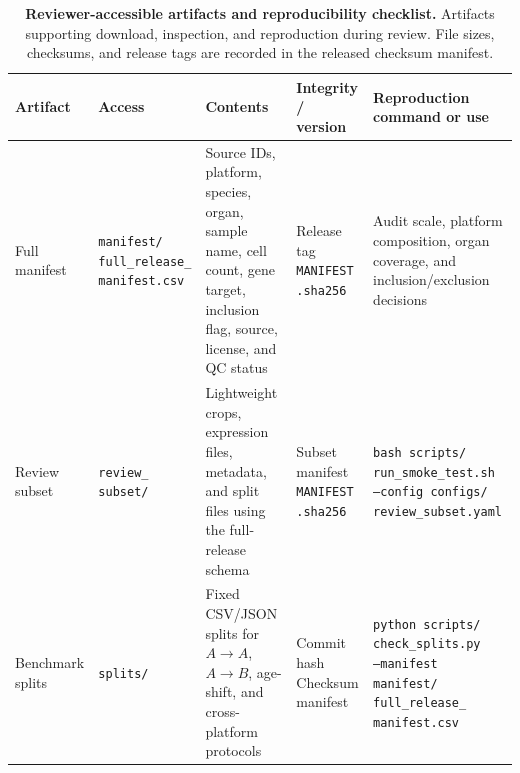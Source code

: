 \documentclass{article}
\begin{document}
\begin{table}[!t]
\centering
\scriptsize
\setlength{\tabcolsep}{2.4pt}
\renewcommand{\arraystretch}{0.98}
\setlength{\abovecaptionskip}{4pt}
\setlength{\belowcaptionskip}{3pt}

\caption{\textbf{Reviewer-accessible artifacts and reproducibility checklist.}
Artifacts supporting download, inspection, and reproduction during review. File sizes, checksums, and release tags are recorded in the released checksum manifest.}
\label{tab:S5_review_artifact_checklist}

\begin{tabularx}{\textwidth}{
>{\raggedright\arraybackslash}p{1.75cm}
>{\raggedright\arraybackslash}p{2.15cm}
>{\raggedright\arraybackslash}X
>{\raggedright\arraybackslash}p{1.90cm}
>{\raggedright\arraybackslash}X
}
\toprule
\textbf{Artifact} &
\textbf{Access} &
\textbf{Contents} &
\textbf{Integrity / version} &
\textbf{Reproduction command or use} \\
\midrule

Full manifest &
\makecell[l]{\texttt{manifest/}\\
\texttt{full\_release\_}\\
\texttt{manifest.csv}} &
Source IDs, platform, species, organ, sample name, cell count, gene target, inclusion flag, source, license, and QC status &
\makecell[l]{Release tag\\
\texttt{MANIFEST}\\
\texttt{.sha256}} &
Audit scale, platform composition, organ coverage, and inclusion/exclusion decisions \\

Review subset &
\makecell[l]{\texttt{review\_}\\
\texttt{subset/}} &
Lightweight crops, expression files, metadata, and split files using the full-release schema &
\makecell[l]{Subset manifest\\
\texttt{MANIFEST}\\
\texttt{.sha256}} &
\makecell[l]{\texttt{bash scripts/}\\
\texttt{run\_smoke\_test.sh}\\
\texttt{--config configs/}\\
\texttt{review\_subset.yaml}} \\

Benchmark splits &
\texttt{splits/} &
Fixed CSV/JSON splits for $A\!\to\!A$, $A\!\to\!B$, age-shift, and cross-platform protocols &
\makecell[l]{Commit hash\\
Checksum manifest} &
\makecell[l]{\texttt{python scripts/}\\
\texttt{check\_splits.py}\\
\texttt{--manifest manifest/}\\
\texttt{full\_release\_}\\
\texttt{manifest.csv}} \\


\end{tabularx}
\end{table}
\end{document}
